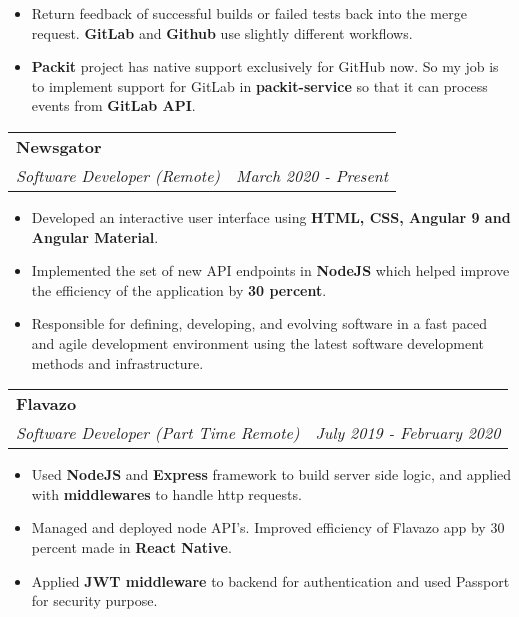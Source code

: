 \documentclass[a4paper,6pt]{article}
\begin{document}
\small
\begin{itemize}
	\itemsep0em
	\item Return feedback of successful builds or failed tests back into the merge request. \textcolor{mygray}{\textbf{GitLab}} and \textcolor{mygray}{\textbf{Github}} use slightly different workflows.
	\item \textcolor{mygray}{\textbf{Packit}} project has native support exclusively for GitHub now. So my job is to implement support for GitLab in \textcolor{mygray}{\textbf{packit-service}} so that it can process events from \textcolor{mygray}{\textbf{GitLab API}}. 
\end{itemize}
\normalsize

\vspace{7px}
\hspace{5px}
\begin{tabularx}{\textwidth}{X r}
	\large{\textbf{Newsgator}} \vspace{1px} & \\
	\textit{\small Software Developer (Remote)}& \textit{March 2020 - Present} \\
\end{tabularx}

\small
\begin{itemize}
	\itemsep0em
	\item Developed an interactive user interface using \textcolor{mygray}{\textbf{HTML, CSS, Angular 9 and Angular Material}}.
	\item Implemented the set of new API endpoints in \textcolor{mygray}{\textbf{NodeJS}} which helped improve the efficiency of the application by \textcolor{mygray}{\textbf{30 percent}}.
	\item Responsible for defining, developing, and evolving software in a fast paced and agile development environment using the latest software development methods and infrastructure.
\end{itemize}
\normalsize

\vspace{4px}
\hspace{5px}
\begin{tabularx}{\textwidth}{X r}
	\large{\textbf{Flavazo}} \vspace{4px} & \\
	\textit{\small Software Developer (Part Time Remote)} & \textit{July 2019 - February 2020} \\
\end{tabularx}

\small
\begin{itemize}
	\itemsep0em
	\item Used \textcolor{mygray}{\textbf{NodeJS}} and \textcolor{mygray}{\textbf{Express}} framework to build server side logic, and applied with \textcolor{mygray}{\textbf{middlewares}} to handle http requests.
	\item Managed and deployed node API’s. Improved efficiency of Flavazo app by 30 percent made in \textcolor{mygray}{\textbf{React Native}}. 
    \item Applied \textcolor{mygray}{\textbf{JWT middleware}} to backend for authentication and used Passport for security purpose.
\end{itemize}
\end{document}
